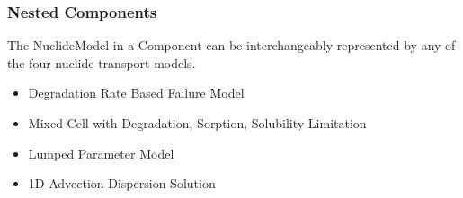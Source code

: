 \begin{frame}
  \frametitle{Nested Components}
  The NuclideModel in a Component can be interchangeably represented by any of 
  the four nuclide transport models. 
    \begin{itemize}
      \item Degradation Rate Based Failure Model
      \item Mixed Cell with Degradation, Sorption, Solubility Limitation
      \item Lumped Parameter Model
      \item 1D Advection Dispersion Solution
    \end{itemize}
\end{frame}

